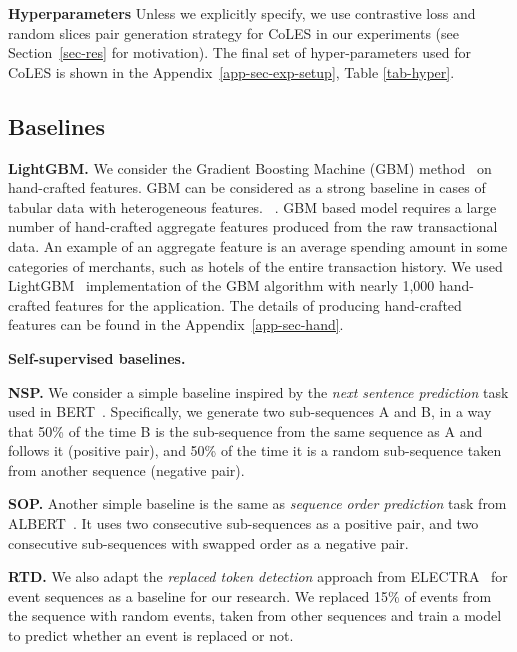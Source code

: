 \documentclass[sigconf]{acmart}
\begin{document}
\textbf{Hyperparameters} Unless we explicitly specify, we use contrastive loss and random slices pair generation strategy for CoLES in our experiments (see Section~\ref{sec-res} for motivation). The final set of hyper-parameters used for CoLES is shown in the Appendix~\ref{app-sec-exp-setup}, Table \ref{tab-hyper}.

\subsection{Baselines} \label{sec-baselines}


\textbf{LightGBM.} We consider the Gradient Boosting Machine (GBM) method~\citep{Friedman2001GreedyFA} on hand-crafted features. GBM can be considered as a strong baseline in cases of tabular data with heterogeneous features.
~\citep{Wu2009AdaptingBF, Vorobev2019LearningTS, Zhang2015AGB, Niu2019ACS}.
GBM based model requires a large number of hand-crafted aggregate features produced from the raw transactional data. An example of an aggregate feature is an average spending amount in some categories of merchants, such as hotels of the entire transaction history.
We used LightGBM~\citep{Ke2017LightGBMAH} implementation of the GBM algorithm with nearly 1,000 hand-crafted features for the application. The details of producing hand-crafted features can be found in the Appendix~\ref{app-sec-hand}.

\textbf{Self-supervised baselines.} 

\textbf{NSP.} We consider a simple baseline inspired by the \textit{next sentence prediction} task used in BERT~\citep{Devlin2019BERTPO}. Specifically, we generate two sub-sequences A and B, in a way that 50\% of the time B is the sub-sequence from the same sequence as A and follows it (positive pair), and 50\% of the time it is a random sub-sequence taken from another sequence (negative pair).

\textbf{SOP.} Another simple baseline is the same as \textit{sequence order prediction} task from ALBERT~\citep{Lan2020ALBERTAL}. It uses two consecutive sub-sequences as a positive pair, and two consecutive sub-sequences with swapped order as a negative pair.

\textbf{RTD.} We also adapt the \textit{replaced token detection} approach from ELECTRA~\citep{Clark2020ELECTRAPT} for event sequences as a baseline for our research. We replaced 15\% of events from the sequence with random events, taken from other sequences and train a model to predict whether an event is replaced or not.
\end{document}

